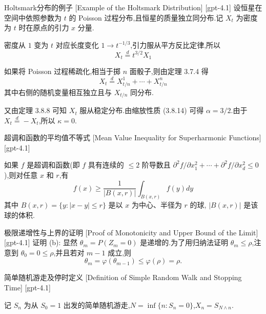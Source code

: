 \documentclass[UTF8]{ctexart}
\begin{document}
    
    
    \begin{xmp}
        {Holtsmark分布的例子}
        [Example of the Holtsmark Distribution]
        [gpt-4.1]
        设恒星在空间中依照参数为 $t$ 的 Poisson 过程分布,且恒星的质量独立同分布.记 $X_t$ 为密度为 $t$ 时在原点的引力 $x$ 分量.

密度从 $1$ 变为 $t$ 对应长度变化 $1 \to t^{-1/3}$,引力服从平方反比定律,所以
\[
X_{t} \overset{d}{=} t^{3/2} X_{1}
\]

如果将 Poisson 过程稀疏化,相当于掷 $n$ 面骰子,则由定理 3.7.4 得
\[
X_{t} \overset{d}{=} X_{t/n}^{1} + \cdots + X_{t/n}^{n}
\]
其中右侧的随机变量相互独立且与 $X_{t/n}$ 同分布.

又由定理 3.8.8 可知 $X_t$ 服从稳定分布.由缩放性质 (3.8.14) 可得 $\alpha = 3/2$.由于 $X_t \overset{d}{=} -X_t$,所以 $\kappa = 0$.

    \end{xmp}
    
    
    
    \begin{ppt}
        {超调和函数的平均值不等式}
        [Mean Value Inequality for Superharmonic Functions]
        [gpt-4.1]
        
如果 $f$ 是超调和函数(即 $f$ 具有连续的 $\leq 2$ 阶导数且 $\partial ^{2} f / \partial x_{1}^{2} + \cdots + \partial ^{2} f / \partial x_{d}^{2} \leq 0$),则对任意 $x$ 和 $r$,有
\[
f(x) \geq \frac{1}{|B(x, r)|} \int_{B(x, r)} f(y) d y
\]
其中 $B(x, r) = \{ y : |x - y| \leq r \}$ 是以 $x$ 为中心、半径为 $r$ 的球, $|B(x, r)|$ 是该球的体积.

    \end{ppt}
    
    
    
    \begin{prf}
        {极限递增性与上界的证明}
        [Proof of Monotonicity and Upper Bound of the Limit]
        [gpt-4.1]
        证明 (b): 显然 $\theta_m = P(Z_m = 0)$ 是递增的.为了用归纳法证明 $\theta_m \leq \rho$,注意到 $\theta_0 = 0 \leq \rho$,并且若对 $m-1$ 成立,则
\[
\theta_m = \varphi(\theta_{m-1}) \leq \varphi(\rho) = \rho.
\]

    \end{prf}
    
    
    
    \begin{dfn}
        {简单随机游走及停时定义}
        [Definition of Simple Random Walk and Stopping Time]
        [gpt-4.1]
        
记 $S_n$ 为从 $S_0 = 1$ 出发的简单随机游走,$N = \inf\{ n : S_n = 0 \}$,$X_n = S_{N \wedge n}$.

    \end{dfn}
    
\end{document}
